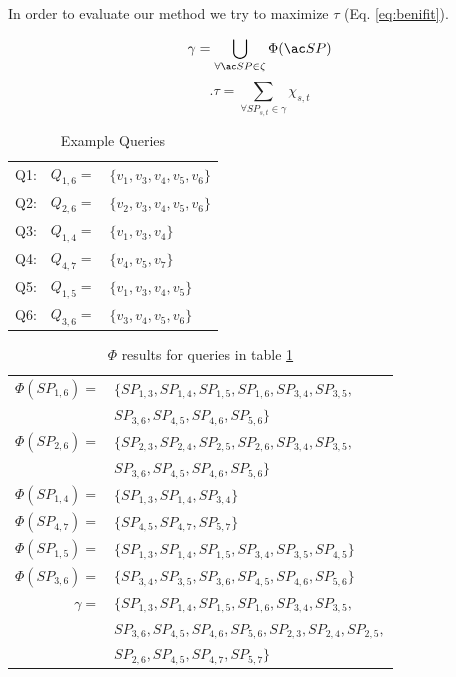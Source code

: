 In order to evaluate our method we try to maximize $\tau$ (Eq. \ref{eq:benifit}).



\begin{equation} \label{eq:gamma}
 \gamma = \bigcup\limits_{\forall \spath \in \zeta} \Phi(\spath) \\
\end{equation}
\begin{equation} \label{eq:benifit}.
\tau = \sum\limits_{\forall SP_{s,t} \in \gamma} \chi_{s,t}
\end{equation}


\begin{table}
\begin{tabular}{l l p{}}
Q1:	&	$Q_{1,6} =$ 	& $\{v_1,v_3,v_4,v_5,v_6\}$\\
Q2:	&	$Q_{2,6} =$ 	& $\{v_2,v_3,v_4,v_5,v_6\}$ \\
Q3:	&	$Q_{1,4} =$ 	& $\{v_1,v_3,v_4\}$ \\
Q4:	&	$Q_{4,7} =$ 	& $\{v_4,v_5,v_7\}$ \\
Q5:	&	$Q_{1,5} =$ 	& $\{v_1,v_3,v_4,v_5\}$ \\
Q6:	&	$Q_{3,6} =$ 	& $\{v_3,v_4,v_5,v_6\}$ \\
\end{tabular}
\caption{Example Queries}
\label{tab:queries}
\end{table}

\begin{table}
\begin{tabular}{r p{}}
$\Phi(SP_{1,6})=$ 	& $\{SP_{1,3},SP_{1,4},SP_{1,5},SP_{1,6},SP_{3,4},SP_{3,5},$\\
		 	& $SP_{3,6},SP_{4,5},SP_{4,6},SP_{5,6}\}$ \\
$\Phi(SP_{2,6})=$ 	& $\{SP_{2,3},SP_{2,4},SP_{2,5},SP_{2,6},SP_{3,4},SP_{3,5},$ \\
			& $SP_{3,6},SP_{4,5},SP_{4,6},SP_{5,6}\}$ \\
$\Phi(SP_{1,4})=$ 	& $\{SP_{1,3},SP_{1,4},SP_{3,4}\}$ \\
$\Phi(SP_{4,7})=$ 	& $\{SP_{4,5},SP_{4,7},SP_{5,7}\}$ \\
$\Phi(SP_{1,5})=$ 	& $\{SP_{1,3},SP_{1,4},SP_{1,5},SP_{3,4},SP_{3,5},SP_{4,5}\}$ \\
$\Phi(SP_{3,6})=$ 	& $\{SP_{3,4},SP_{3,5},SP_{3,6},SP_{4,5},SP_{4,6},SP_{5,6}\}$ \\\hline
$\gamma =$ 		& $\{SP_{1,3},SP_{1,4},SP_{1,5},SP_{1,6},SP_{3,4},SP_{3,5},$ \\
			& $SP_{3,6},SP_{4,5},SP_{4,6},SP_{5,6},SP_{2,3},SP_{2,4},SP_{2,5},$ \\
			& $SP_{2,6},SP_{4,5},SP_{4,7},SP_{5,7}\}$  \\
\end{tabular}
\caption{$\Phi$ results for queries in table \ref{tab:queries}}
\label{tab:phi}
\end{table}


